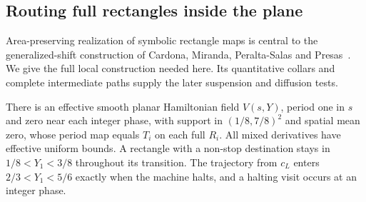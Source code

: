 \subsection{Routing full rectangles inside the plane}
Area-preserving realization of symbolic rectangle maps is central to the generalized-shift construction of Cardona, Miranda, Peralta-Salas and Presas~\cite[Proposition~5.1]{CardonaMirandaPeraltaSalasPresas2021}. We give the full local construction needed here. Its quantitative collars and complete intermediate paths supply the later suspension and diffusion tests.
\begin{lemma}\label{bcs:expanded-processor}
There is an effective smooth planar Hamiltonian field $V(s,Y)$, period one in $s$ and zero near each integer phase, with support in $(1/8,7/8)^2$ and spatial mean zero, whose period map equals $T_i$ on each full $R_i$. All mixed derivatives have effective uniform bounds. A rectangle with a non-stop destination stays in $1/8<Y_1<3/8$ throughout its transition. The trajectory from $c_L$ enters $2/3<Y_1<5/6$ exactly when the machine halts, and a halting visit occurs at an integer phase.
\end{lemma}
